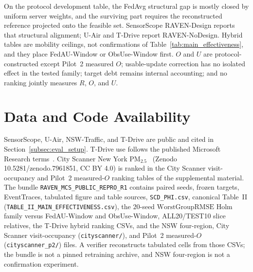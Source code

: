 \documentclass[letterpaper,journal]{IEEEtran}
\begin{document}
On the protocol development table, the FedAvg structural gap is mostly
closed by uniform server weights, and the surviving part requires the
reconstructed reference projected onto the feasible set.  SensorScope
RAVEN-Design reports that structural alignment; U-Air and T-Drive report
RAVEN-NoDesign.  Hybrid tables are mobility ceilings, not confirmations of
Table~\ref{tab:main_effectiveness}, and they place FedAU-Window or ObsUse-Window
first.  $O$ and $U$ are protocol-constructed except Pilot~2 measured $O$;
usable-update correction has no isolated effect in the tested family; target debt
remains internal accounting; and no ranking jointly measures $R$, $O$, and $U$.

\section*{Data and Code Availability}
SensorScope, U-Air, NSW-Traffic, and T-Drive are public and cited in
Section~\ref{subsec:eval_setup}.  T-Drive use follows the published
Microsoft Research terms~\cite{yuan2010tdrive}.
City Scanner New York {PM}$_{2.5}$~\cite{wang2023cityscanner}
(Zenodo 10.5281/zenodo.7961851, CC BY 4.0) is ranked in
the City Scanner visit-occupancy and Pilot~2 measured-$O$ ranking tables of the
supplemental material.
The bundle \texttt{RAVEN\_MCS\_PUBLIC\_REPRO\_R1} contains paired seeds,
frozen targets, EventTraces, tabulated figure and table sources,
\texttt{SCD\_PHI.csv}, canonical Table~II
(\texttt{TABLE\_II\_MAIN\_EFFECTIVENESS.csv}),
the $20$-seed $\mathrm{WorstGroupRMSE}$ Holm family versus FedAU-Window and
ObsUse-Window, ALL20/TEST10 slice relatives, the T-Drive hybrid ranking CSVs,
and the NSW four-region, City Scanner visit-occupancy
(\texttt{cityscanner/}), and Pilot~2 measured-$O$ (\texttt{cityscanner\_p2/})
files.  A verifier reconstructs tabulated cells from those CSVs; the bundle is
not a pinned retraining archive, and NSW four-region is not a confirmation
experiment.
\end{document}
